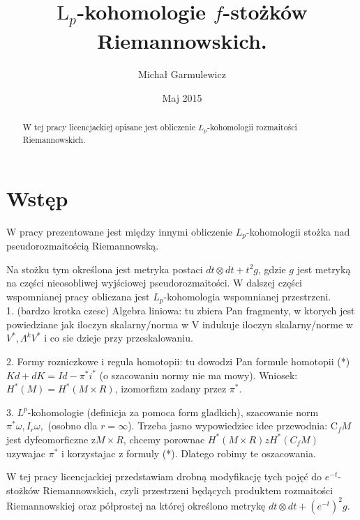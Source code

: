 \documentclass[licencjacka]{pracamgr}
\author{Michał Garmulewicz}
\title{$\mathrm{L}_p$-kohomologie $f$-stożków Riemannowskich.}
\date{Maj 2015}
\theoremstyle{definition}
\theoremstyle{definition}
\theoremstyle{plain}
\theoremstyle{plain}
\theoremstyle{plain}
\theoremstyle{plain}
\begin{document}
\maketitle

\begin{abstract}
  W tej pracy licencjackiej opisane jest obliczenie $L_p$-kohomologii
  rozmaitości Riemannowskich.
\end{abstract}

\tableofcontents

\chapter{Wstęp}

W pracy \cite{weber} prezentowane jest między innymi obliczenie
$L_p$-kohomologii stożka nad pseudorozmaitością Riemannowską. 

Na stożku tym określona jest metryka postaci
$dt \otimes dt + t^2 g$, gdzie $g$ 
jest metryką na części nieosobliwej wyjściowej pseudorozmaitości.
W dalszej części wspomnianej pracy obliczana jest $L_p$-kohomologia
wspomnianej przestrzeni.
\\

1. (bardzo krotka czesc) Algebra liniowa: tu zbiera Pan fragmenty, w ktorych
jest powiedziane jak iloczyn skalarny/norma w V indukuje iloczyn skalarny/norme
w $V^*, \Lambda^k V^*$ i co sie dzieje przy przeskalowaniu.


2. Formy rozniczkowe i regula homotopii: tu dowodzi Pan formule homotopii (*)
$Kd+dK = Id -\pi^*i^*$ (o szacowaniu normy nie ma mowy).  Wniosek:
$H^*(M)=H^*(M\times R)$, izomorfizm zadany przez $\pi^*$.


3. $L^p$-kohomologie (definicja za pomoca form gladkich), szacowanie norm
$\pi^*\omega, I_r\omega,$ (osobno dla $r=\infty$).  Trzeba jasno wypowiedziec idee
przewodnia: C$_fM$ jest dyfeomorficzne z$ M\times R$, chcemy porownac $H^*(M\times
R) z H^*(C_fM)$ uzywajac $\pi^*$ i korzystajac z formuly (*). Dlatego robimy te
oszacowania.


W tej pracy licencjackiej przedstawiam drobną modyfikację tych pojęć do
$e^{-t}$-stożków Riemannowskich, czyli przestrzeni będących produktem
rozmaitości Riemannowskiej oraz półprostej na której określono metrykę
$dt \otimes dt + (e^{-t})^2 g$. \\
\end{document}
